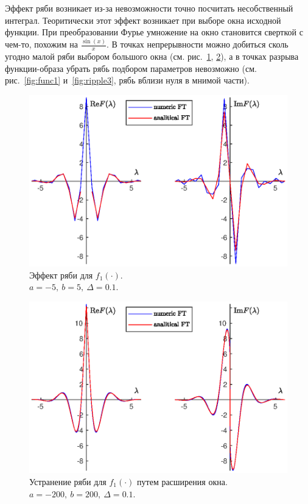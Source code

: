 \documentclass[12pt, a4paper]{article} %
\begin{document}
Эффект ряби возникает из-за невозможности точно посчитать несобственный интеграл.
Теоритически этот эффект возникает при выборе окна исходной функции.
При преобразовании Фурье умножение на окно становится сверткой с чем-то,
похожим на $\frac{\sin(x)}{x}$.
В точках непрерывности можно добиться сколь угодно малой ряби выбором большого окна (см. рис.~\ref{fig:ripple1}, \ref{fig:ripple2}),
а в точках разрыва функции-образа убрать рябь подбором параметров невозможно 
(см. рис.~\ref{fig:func1} и~\ref{fig:ripple3}, рябь вблизи нуля в мнимой части).

\begin{figure}[b]
    \centering
    \includegraphics[width=\textwidth]{figures/ripple1.eps}
    \caption{Эффект ряби для $f_1(\cdot)$.\\
    $a = -5,\ b = 5,\ \Delta = 0.1$.}
    \label{fig:ripple1}
\end{figure}

\begin{figure}[b]
    \centering
    \includegraphics[width=\textwidth]{figures/ripple2.eps}
    \caption{
    Устранение ряби для $f_1(\cdot)$ путем расширения окна.\newline
    $a = -200,\ b = 200,\ \Delta = 0.1$.}
    \label{fig:ripple2}
\end{figure}
\end{document}
